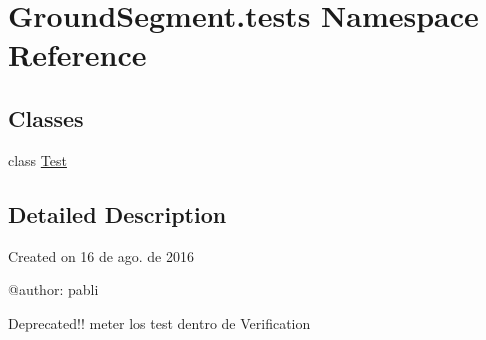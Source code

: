 \hypertarget{namespace_ground_segment_1_1tests}{}\section{Ground\+Segment.\+tests Namespace Reference}
\label{namespace_ground_segment_1_1tests}
\subsection*{Classes}
\begin{DoxyCompactItemize}
\item 
class \hyperlink{class_ground_segment_1_1tests_1_1_test}{Test}
\end{DoxyCompactItemize}


\subsection{Detailed Description}
\begin{DoxyVerb}Created on 16 de ago. de 2016

@author: pabli

Deprecated!! meter los test dentro de Verification
\end{DoxyVerb}
 